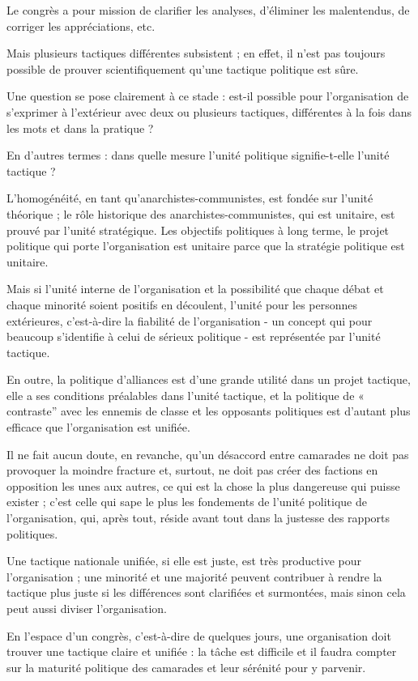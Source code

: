 Le congrès a pour mission de clarifier les analyses, d'éliminer les malentendus, de corriger les appréciations, etc.

Mais plusieurs tactiques différentes subsistent ; en effet, il n'est pas toujours possible de prouver scientifiquement qu'une tactique politique est sûre.

Une question se pose clairement à ce stade : est-il possible pour l'organisation de s'exprimer à l'extérieur avec deux ou plusieurs tactiques, différentes à la fois dans les mots et dans la pratique ?

En d'autres termes : dans quelle mesure l'unité politique signifie-t-elle l'unité tactique ?

L'homogénéité, en tant qu'anarchistes-communistes, est fondée sur l'unité théorique ; le rôle historique des anarchistes-communistes, qui est unitaire, est prouvé par l'unité stratégique. Les objectifs politiques à long terme, le projet politique qui porte l'organisation est unitaire parce que la stratégie politique est unitaire.

Mais si l'unité interne de l'organisation et la possibilité que chaque débat et chaque minorité soient positifs en découlent, l'unité pour les personnes extérieures, c'est-à-dire la fiabilité de  l'organisation - un concept qui pour beaucoup s'identifie à celui de sérieux politique - est représentée par l'unité tactique.

En outre, la politique d'alliances est d'une grande utilité dans un projet tactique, elle a ses conditions préalables dans l'unité tactique, et la politique de « contraste'' avec les ennemis de classe et les opposants politiques est d'autant plus efficace que l'organisation est unifiée.

Il ne fait aucun doute, en revanche, qu'un désaccord entre camarades ne doit pas provoquer la moindre fracture et, surtout, ne doit pas créer des factions en opposition les unes aux autres, ce qui est la chose la plus dangereuse qui puisse exister ; c'est celle qui sape le plus les fondements de l'unité politique de l'organisation, qui, après tout, réside avant tout dans la justesse des rapports politiques.

Une tactique nationale unifiée, si elle est juste, est très productive pour l'organisation ; une minorité et une majorité peuvent contribuer à rendre la tactique plus juste si les différences sont clarifiées et surmontées, mais sinon cela peut aussi diviser l'organisation.

En l'espace d'un congrès, c'est-à-dire de quelques jours, une organisation doit trouver une tactique claire et unifiée : la tâche est difficile et il faudra compter sur la maturité politique des camarades et leur sérénité pour y parvenir.

